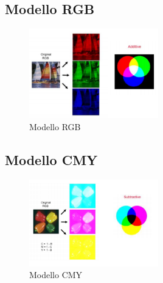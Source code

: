 \documentclass[12pt]{article}
\begin{document}
\subsection{Modello RGB}
\begin{figure}[!htb]
    \centering
    \includegraphics[width=0.5\textwidth]{Images/rgb.png}
    \caption{Modello RGB}
\end{figure}
\FloatBarrier
\subsection{Modello CMY}
\begin{figure}[!htb]
    \centering
    \includegraphics[width=0.5\textwidth]{Images/cmy.png}
    \caption{Modello CMY}
\end{figure}
\FloatBarrier
\newpage
\end{document}
